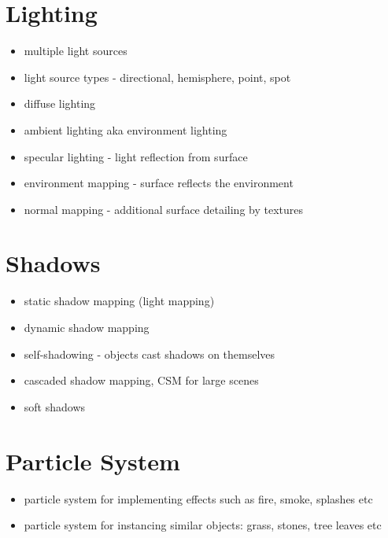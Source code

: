 \documentclass[a4paper,12pt,oneside]{sphinxmanual}
\begin{document}
\section{Lighting}
\label{features:id4}\begin{itemize}
\item {} 
multiple light sources

\item {} 
light source types - directional, hemisphere, point, spot

\item {} 
diffuse lighting

\item {} 
ambient lighting aka environment lighting

\item {} 
specular lighting - light reflection from surface

\item {} 
environment mapping - surface reflects the environment

\item {} 
normal mapping - additional surface detailing by textures

\end{itemize}


\section{Shadows}
\label{features:id5}\begin{itemize}
\item {} 
static shadow mapping (light mapping)

\item {} 
dynamic shadow mapping

\item {} 
self-shadowing - objects cast shadows on themselves

\item {} 
cascaded shadow mapping, CSM for large scenes

\item {} 
soft shadows

\end{itemize}


\section{Particle System}
\label{features:id6}\begin{itemize}
\item {} 
particle system for implementing effects such as fire, smoke, splashes etc

\item {} 
particle system for instancing similar objects: grass, stones, tree leaves etc

\end{itemize}
\end{document}
